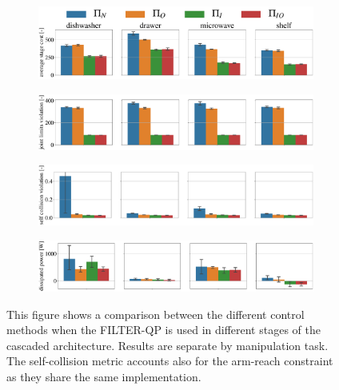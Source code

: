 \begin{figure}[t]
\centering
\hspace*{-0.4cm} 
\begin{subfigure}{\columnwidth}
    \includegraphics[width=\linewidth]{figures/methods_comparison/average_stage_cost.pdf}
\end{subfigure}%
\hfill
\hspace*{-0.4cm} 
\begin{subfigure}{\columnwidth}
    \includegraphics[width=\linewidth]{figures/methods_comparison/joint_limits.pdf}
\end{subfigure}%
\hfill
\hspace*{-0.4cm} 
\begin{subfigure}{\columnwidth}
    \includegraphics[width=\linewidth]{figures/methods_comparison/self_collision.pdf}
\end{subfigure}
\hspace*{-0.4cm} 
\begin{subfigure}{\columnwidth}
    \includegraphics[width=\linewidth]{figures/methods_comparison/dissipated_power.pdf}
\end{subfigure}
\hfill
\caption{This figure shows a comparison between the different control methods when the FILTER-QP is used in different stages of the cascaded architecture. Results are separate by manipulation task. The self-collision metric accounts also for the arm-reach constraint as they share the same implementation.}\label{fig:methods_comparison}
\end{figure}

